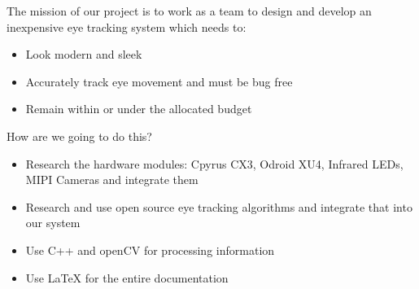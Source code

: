 The mission of our project is to work as a team to design and develop an inexpensive eye tracking system which needs to:
\begin{itemize}
\item Look modern and sleek
\item Accurately track eye movement and must be bug free
\item Remain within or under the allocated budget 
\end{itemize}
How are we going to do this?
\begin{itemize}
\item Research the hardware modules: Cpyrus CX3, Odroid XU4, Infrared LEDs, MIPI Cameras and integrate them
\item Research and use open source eye tracking algorithms and integrate that into our system
\item Use C++ and openCV for processing information
\item Use LaTeX for the entire documentation
\end{itemize}
